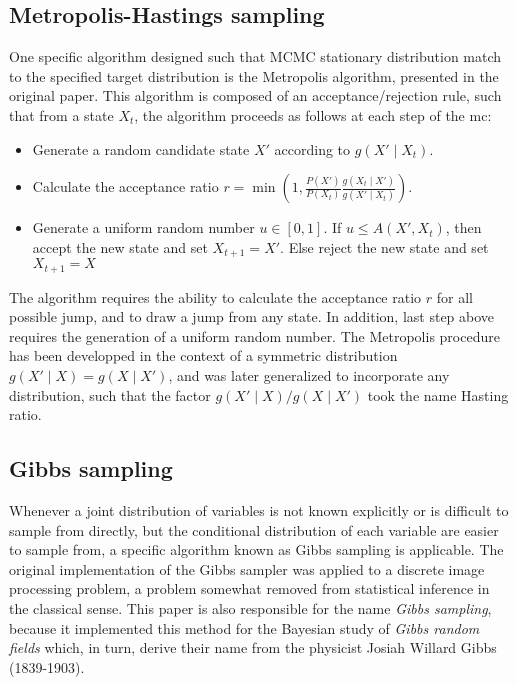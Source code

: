 \subsection{Metropolis-Hastings sampling}

One specific algorithm designed such that MCMC stationary distribution match to the specified target distribution is the Metropolis algorithm, presented in the original paper.
This algorithm is composed of an acceptance/rejection rule, such that from a state $X_t$, the algorithm proceeds as follows at each step of the \gls{mc}:
\begin{itemize}
    \item Generate a random candidate state $X'$ according to $g(X'\mid X_t)$.
    \item Calculate the acceptance ratio $\displaystyle r=\min \left(1,{\frac {P(X')}{P(X_{t})}}{\frac {g(X_{t}\mid X')}{g(X'\mid X_{t})}}\right)$.
    \item Generate a uniform random number $u\in [0,1]$.
    If $u\leq A(X',X_{t})$, then accept the new state and set $X_{t+1}=X'$.
    Else reject the new state and set $X_{t+1}=X$
\end{itemize}

The algorithm requires the ability to calculate the acceptance ratio $r$ for all possible jump, and to draw a jump from any state.
In addition, last step above requires the generation of a uniform random number.
The Metropolis procedure has been developped in the context of a symmetric distribution $g(X'\mid X) = g(X \mid X')$, and was later generalized to incorporate any distribution, such that the factor $g(X'\mid X) / g(X \mid X')$ took the name Hasting ratio.

\subsection{Gibbs sampling}

Whenever a joint distribution of variables is not known explicitly or is difficult to sample from directly, but the conditional distribution of each variable are easier to sample from, a specific algorithm known as Gibbs sampling is applicable.
The original implementation of the Gibbs sampler was applied to a discrete image processing problem, a problem somewhat removed from statistical inference in the classical sense.
This paper is also responsible for the name {\it Gibbs sampling}, because it implemented this method for the Bayesian study of {\it Gibbs random fields} which, in turn, derive their name from the physicist Josiah Willard Gibbs (1839-1903).

